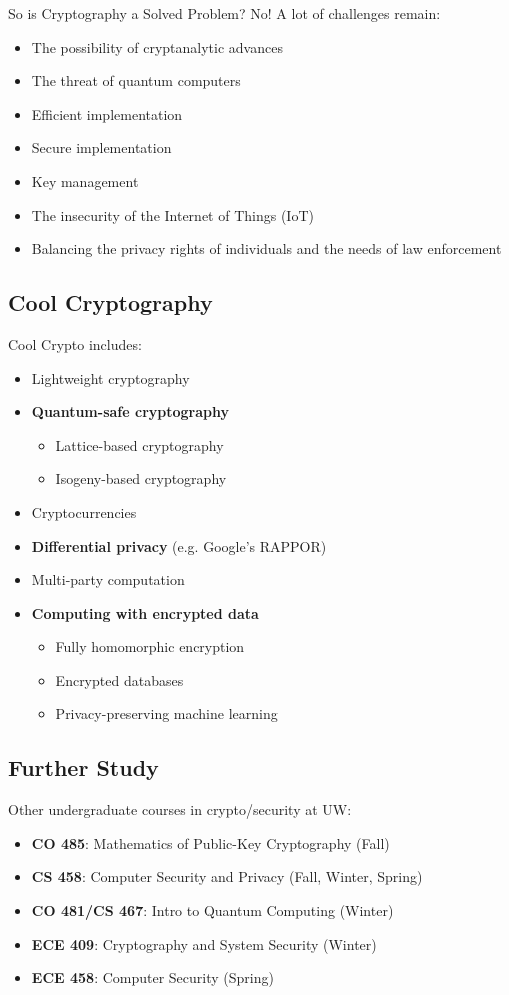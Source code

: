 \documentclass[12pt,titlepage]{article}
\begin{document}
So is Cryptography a Solved Problem? No! A lot of challenges remain:\begin{itemize}
	\item The possibility of cryptanalytic advances
	\item The threat of quantum computers
	\item Efficient implementation
	\item Secure implementation
	\item Key management
	\item The insecurity of the Internet of Things (IoT)
	\item Balancing the privacy rights of individuals and the needs of law enforcement
\end{itemize}

\subsection{Cool Cryptography}
Cool Crypto includes: \begin{itemize}
	\item Lightweight cryptography
	\item \textbf{Quantum-safe cryptography}\begin{itemize}
		\item Lattice-based cryptography
		\item Isogeny-based cryptography
	\end{itemize}
	\item Cryptocurrencies
	\item \textbf{Differential privacy} (e.g. Google’s RAPPOR)
	\item Multi-party computation
	\item \textbf{Computing with encrypted data}\begin{itemize}
		\item Fully homomorphic encryption
		\item Encrypted databases
		\item Privacy-preserving machine learning
	\end{itemize}
\end{itemize}
\subsection{Further Study}
Other undergraduate courses in crypto/security at UW:\begin{itemize}
	\item \textbf{CO 485}: Mathematics of Public-Key Cryptography (Fall)
	\item \textbf{CS 458}: Computer Security and Privacy (Fall, Winter, Spring)
	\item \textbf{CO 481/CS 467}: Intro to Quantum Computing (Winter)
	\item \textbf{ECE 409}: Cryptography and System Security (Winter)
	\item \textbf{ECE 458}: Computer Security (Spring)
\end{itemize}
\end{document}
